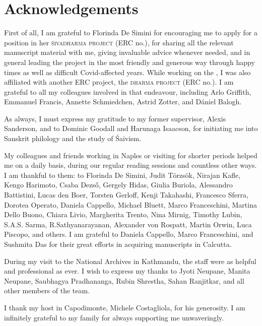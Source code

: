 \thispagestyle{empty}
\chapter*{Acknowledgements}
\label{acknowledgements}
\vspace{-1em}

\noindent
First of all, I am grateful to Florinda De Simini for
encouraging me to apply for a position in her 
\textsc{\hbox{śivadharma} project} (ERC no.),
for sharing all the relevant manuscript material with me, 
giving invaluable advice whenever needed, and in general
leading the project in the most friendly and
generous way through happy times as well as 
difficult Covid-affected years. 
While working on the \Vss, I was also affiliated with 
another ERC project, the \textsc{dharma project} (ERC no.).
I am grateful to all my colleagues involved in that endeavour,
including Arlo Griffith, Emmanuel Francis, Annette Schmiedchen, 
Astrid Zotter, and Dániel Balogh.

As always, I must express my gratitude to my former supervisor,
Alexis Sanderson, and to Dominic Goodall and 
Harunaga Isaacson, for initiating me into Sanskrit philology and
the study of Śaivism.

My colleagues and friends working in Naples or visiting for
shorter periods helped me on a daily basis, during our regular reading sessions and countless
other ways. I am thankful to them:
 to Florinda De Simini, Judit Törzsök, Nirajan Kafle, Kengo Harimoto, Csaba Dezső, Gergely Hidas,
Giulia Buriola, Alessandro Battistini, Lucas den Boer, Torsten Gerloff, Kenji Takahashi, Francesco Sferra, Dorotea Operato, Daniela Cappello,
Michael Bluett, Marco Franceschini, Martina Dello Buono, Chiara Livio, Margherita Trento, Nina Mirnig, Timothy Lubin, S.A.S. Sarma,
R.\thinspace Sathyanarayanan, Alexander von Rospatt, Martin Orwin, Luca Piscopo, and others.
I am grateful to Daniela Cappello, Marco Franceschini, and Sushmita Das for their great efforts in acquiring manu\-scripts in Calcutta.

During my visit to the National Archives in
Kathmandu, the staff were as helpful and professional as ever.
I wish to express my thanks to Jyoti Neupane, Manita Neupane, Saubhagya Pradhananga, Rubin Shrestha, Sahan Ranjitkar, and all %
other members of the team.

I thank my host in Capodimonte, Michele Costagliola, for his generosity. 
I am infinitely grateful to my family for always supporting me unwaveringly.

